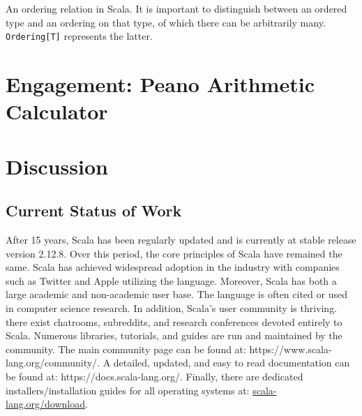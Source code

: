 \documentclass[jou,apacite]{IEEEtran}
\begin{document}
\begin{listing}
  \inputminted[firstline=3, frame=single]{Scala}{../examples/Ord.scala}
  \caption{An ordering relation in Scala. It is important to distinguish between
    an ordered type and an ordering on that type, of which there can be
    arbitrarily many. \texttt{Ordering[T]} represents the latter.}
  \label{lst:ordering}
\end{listing}




\section{Engagement: Peano Arithmetic Calculator}
\label{sec:engag-peano-arithm}

\section{Discussion}
\label{sec:discussion}

\subsection{Current Status of Work}
After 15 years, Scala has been regularly updated and is currently at stable
release version 2.12.8. Over this period, the core principles of Scala have
remained the same. Scala has achieved widespread adoption in the industry with
companies such as Twitter and Apple utilizing the language. Moreover, Scala has
both a large academic and non-academic user base. The language is often cited or
used in computer science research. In addition, Scala's user community is
thriving. there exist chatrooms, subreddits, and research conferences devoted
entirely to Scala. Numerous libraries, tutorials, and guides are run and
maintained by the community. The main community page can be found at:
https://www.scala-lang.org/community/. A detailed, updated, and easy to read
documentation can be found at: https://docs.scala-lang.org/. Finally, there are
dedicated installers/installation guides for all operating systems at:
\href{https://www.scala-lang.org/download/}{scala-lang.org/download}.




\end{document}
